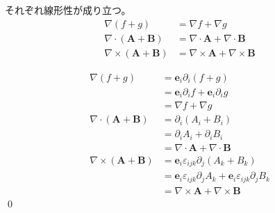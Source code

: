 \documentclass[uplatex,dvipdfmx,a4paper,11pt]{jlreq}
\makeatletter
\newcommand{\ee}{\bm{e}}
\newcommand{\grad}{\nabla}
\renewcommand{\div}{\nabla\cdot}
\newcommand{\rot}{\nabla\times}
\theoremstyle{definition}
\renewenvironment{proof}[1][\proofname]{\par
  \normalfont
  \topsep6\p@\@plus6\p@ \trivlist
  \item[\hskip\labelsep{\bfseries #1}\@addpunct{\bfseries}]\ignorespaces\quad\par
}{%
  \qed\endtrivlist\@endpefalse
}
\renewcommand\proofname{証明}
\makeatother
\begin{document}
\begin{theorem}[勾配・発散・回転の線形性]
  それぞれ線形性が成り立つ。
  \begin{align}
    \grad{(f+g)}          & = \grad{f} + \grad{g}         \\
    \div{(\bm{A}+\bm{B})} & = \div{\bm{A}} + \div{\bm{B}} \\
    \rot{(\bm{A}+\bm{B})} & = \rot{\bm{A}} + \rot{\bm{B}}
  \end{align}
\end{theorem}
\begin{proof}
  \begin{align}
    \grad{(f+g)}            & = \ee_i\partial_i(f+g)                                                      \\
                            & = \ee_i\partial_i f + \ee_i\partial_i g                                     \\
                            & = \grad{f} + \grad{g}                                                       \\
    \div{(\bm{A}+\bm{B})}   & = \partial_i(A_i + B_i)                                                     \\
                            & = \partial_i A_i + \partial_i B_i                                           \\
                            & = \div{\bm{A}}+\div{\bm{B}}                                                 \\
    \rot{(\bm{A} + \bm{B})} & = \ee_i\varepsilon_{ijk}\partial_j(A_k + B_k)                               \\
                            & = \ee_i\varepsilon_{ijk}\partial_jA_k + \ee_i\varepsilon_{ijk}\partial_jB_k \\
                            & = \rot{\bm{A}} + \rot{\bm{B}}
  \end{align}
\end{proof}
\end{document}
